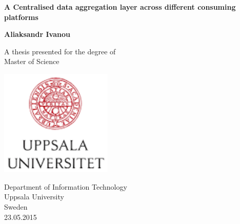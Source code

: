 \documentclass[pdftex,a4paper,14pt,english]{extarticle}
\begin{document}
\begin{titlepage}
    \begin{center}
        \vspace*{1cm}
        
        \textbf{A Centralised data aggregation layer across different consuming platforms}
                
        \vspace{1.5cm}
        
        \textbf{Aliaksandr Ivanou}
        
        \vfill
        
        A thesis presented for the degree of\\
        Master of Science
        
        \vspace{0.8cm}
        
        \includegraphics[width=0.4\textwidth]{images/uulogo.png}
        
        Department of Information Technology \\
        Uppsala University\\
        Sweden\\
        23.05.2015
        
    \end{center}
\end{titlepage}

\newpage\mbox{}\newpage




\setcounter{page}{1}
\tableofcontents

\newpage



% 





% 

\newpage


\newpage

\end{document}
